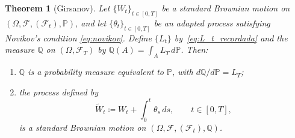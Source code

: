 \documentclass[11pt,a4paper,oneside]{report}
\theoremstyle{plain}
\newtheorem{teorema}{Theorem}[chapter]
\theoremstyle{definition}
\theoremstyle{remark}
\newcommand{\PP}{\mathbb{P}}
\newcommand{\Q}{\mathbb{Q}}
\newcommand{\F}{\mathcal{F}}
\newcommand{\1}{\mathbf{1}}
\newcommand{\eqdef}{\coloneqq}
\begin{document}
\begin{teorema}[Girsanov]
\label{teo:girsanov}
Let $\{W_t\}_{t \in [0, T]}$ be a standard Brownian motion on
$(\Omega, \F, (\F_t), \PP)$, and let $\{\theta_t\}_{t \in [0, T]}$ be
an adapted process satisfying Novikov's condition
\eqref{eq:novikov}. Define $\{L_t\}$ by~\eqref{eq:L_t_recordada} and
the measure $\Q$ on $(\Omega, \F_T)$ by
$\Q(A) = \int_A L_T\, d\PP$. Then:
\begin{enumerate}[label=\textnormal{(\roman*)}]
  \item $\Q$ is a probability measure equivalent to $\PP$, with
        $d\Q/d\PP = L_T$;
  \item the process defined by
        \begin{equation}\label{eq:def_W_tilde}
          \widetilde{W}_t \eqdef W_t + \int_0^t \theta_s\, ds,
          \qquad t \in [0, T],
        \end{equation}
        is a standard Brownian motion on
        $(\Omega, \F, (\F_t), \Q)$.
\end{enumerate}
\end{teorema}
\end{document}
